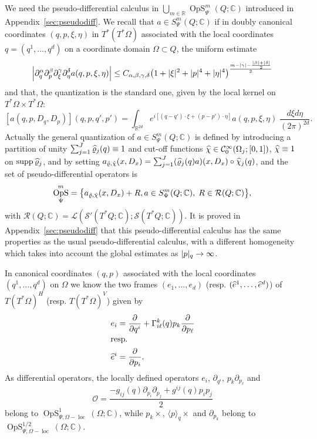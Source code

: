 \documentclass[10pt]{amsart}
\theoremstyle{definition}\newtheorem{defi}[theo]{Definition}\newtheorem{rema}[theo]{Remark}\newtheorem{exam}[theo]{Example}\newtheorem{exem}[theo]{Example}\newtheorem{nota}[theo]{Notation}
\newcommand{\C}{\mathbb{C}}
\newcommand{\R}{\mathbb{R}}
\newcommand{\clC}{\mathcal{C}}
\newcommand{\clO}{\mathcal{O}}
\newcommand{\clS}{\mathcal{S}}
\newcommand{\clL}{\mathcal{L}}
\newcommand{\clR}{\mathcal{R}}
\DeclareMathOperator{\OpS}{OpS}
\DeclareMathOperator{\suppp}{supp}
\DeclareMathOperator{\locc}{loc}
\let\oldhat\hat
\renewcommand*{\hat}[1]{\mathchoice{\widehat{#1}}{\widehat{#1}}{\oldhat{#1}}{\oldhat{#1}}}
\let\originalleft\left
\let\originalright\right
\renewcommand{\left}{\mathopen{}\mathclose\bgroup\originalleft}
\renewcommand{\right}{\aftergroup\egroup\originalright}
\renewcommand*{\to}{\mathchoice{\longrightarrow}{\rightarrow}{\rightarrow}{\rightarrow}}
\begin{document}
We need the pseudo-differential calculus in $\bigcup_{m\in \R}\OpS^{m}_{\Psi}(Q;\C)$ introduced in Appendix~\ref{sec:pseudodiff}. We recall that $a\in S^{m}_{\Psi}(Q;\C)$ if in doubly canonical coordinates $(q,p,\xi,\eta)$ in $T^{*}(T^{*}\Omega)$ associated with the local coordinates $q=(q^{1},\dots,q^{d})$ on a coordinate domain $\Omega\subset Q$, the uniform estimate
\[
\left|\partial_{q}^{\alpha}\partial_{p}^{\beta}\partial_{\xi}^{\gamma}\partial_{\eta}^{\delta}a(q,p,\xi,\eta)\right|\leq C_{\alpha,\beta,\gamma,\delta}\left(1+|\xi|^{2}+|p|^{4}+|\eta|^{4}\right)^{\frac{m-|\gamma|-\frac{|\beta|+|\delta|}{2}}{2}}
\]
and that, the quantization is the standard one, given by the local kernel on $T^{*}\Omega\times T^{*}\Omega$:
\[
[a(q,p,D_{q},D_{p})](q,p,q',p')=\int_{\R^{2d}}e^{i[(q-q')\cdot\xi+(p-p')\cdot\eta]}a(q,p,\xi,\eta)\;\frac{d\xi d\eta}{(2\pi)^{2d}}.
\]
Actually the general quantization of $a\in S^{m}_{\Psi}(Q;\C)$ is defined by introducing a partition of unity $\sum_{j=1}^{J}\hat{\varrho}_{j}(q)\equiv 1$ and cut-off functions $\hat\chi\in \clC^{\infty}_{0}(\Omega_{j};[0,1])$, $\hat\chi\equiv 1$ on $\suppp\hat{\varrho}_{j}$, and by setting $a_{\hat{\varrho},\hat{\chi}}(x,D_{x})=\sum_{j=1}^{J}(\hat{\varrho}_{j}(q)a)(x,D_{x})\circ \hat{\chi}_{j}(q)$, and the set of pseudo-differential operators is
\[
\OpS^{m}_{\Psi}=\bigl\{a_{\hat\varrho,\hat\chi}(x,D_{x})+R, a\in S^{m}_{\Psi}(Q;\C),\; R\in \clR(Q;\C)\bigr\},
\]
with $\clR(Q;\C)=\clL(\clS'(T^{*}Q;\C);\clS(T^{*}Q;\C)). $ It is proved in Appendix~\ref{sec:pseudodiff} that this pseudo-differential calculus has the same properties as the usual pseudo-differential calculus, with a different homogeneity which takes into account the global estimates as $|p|_q\to \infty$.

In canonical coordinates $(q,p)$ associated with the local coordinates $(q^{1},\dots,q^{d})$ on $\Omega$ we know the two frames $(e_{1},\dots,e_{d})$ (resp. $(\hat{e}^{1},\dots,\hat{e}^{d})$) of $T(T^{*}\Omega)^{H}$ (resp. $T(T^{*}\Omega)^{V}$) given by
\begin{align*}
e_{i}&=\frac{\partial}{\partial q^{i}}+\Gamma_{i\ell}^{k}(q)p_{k}\frac{\partial}{\partial p_{\ell}}\\
\intertext{resp.}
\hat{e}^{i}&=\frac{\partial}{\partial p_{i}}.
\end{align*}
As differential operators, the locally defined operators $e_{i}$, $\partial_{q^{i}}$, $p_{k}\partial_{p_{\ell}}$ and
\[
\clO=\frac{-g_{ij}(q)\partial_{p_{i}}\partial_{p_{j}}+g^{ij}(q)p_{i}p_{j}}{2}
\]
belong to $\OpS^{1}_{\Psi, \Omega-\locc}(\Omega;\C)$, while $p_{k}\times$, $\langle p\rangle_{q}\times$ and $\partial_{p_{k}}$ belong to $\OpS^{1/2}_{\Psi,\Omega-\locc}(\Omega;\C)$.
\end{document}
